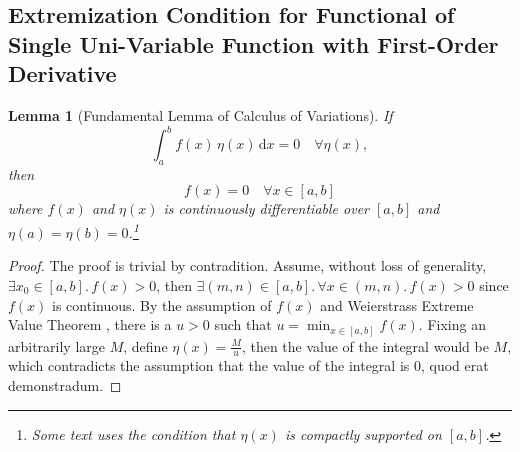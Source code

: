 \documentclass[12pt,a4paper]{article}
\newtheorem{lemma}{Lemma}
\begin{document}
\subsection{Extremization Condition for Functional of Single Uni-Variable Function with First-Order Derivative}
\begin{lemma}[Fundamental Lemma of Calculus of Variations]
\label{lem:fundamental}
If
\[
\int_a^b f(x)\,\eta(x)\,\mathrm{d}x = 0\quad\forall\eta(x),
\]
then
\[
f(x)=0\quad\forall x\in[a,b]
\]
where $f(x)$ and $\eta(x)$ is continuously differentiable over $[a,b]$ and $\eta(a)=\eta(b)=0$.\footnote{Some text uses the condition that $\eta(x)$ is compactly supported on $[a,b]$.}
\end{lemma}
\begin{proof}
The proof is trivial by contradition. Assume, without loss of generality, $\exists x_0\in[a,b].\,f(x)>0$, then $\exists (m,n)\in[a,b].\,\forall x\in(m,n).\,f(x)>0$ since $f(x)$ is continuous. By the assumption of $f(x)$ and Weierstrass Extreme Value Theorem \cite{rudin_principles}, there is a $u>0$ such that $\displaystyle u=\min_{x\in[a,b]}f(x)$. Fixing an arbitrarily large $M$, define $\displaystyle \eta(x)=\frac{M}{u}$, then the value of the integral would be $M$, which contradicts the assumption that the value of the integral is $0$, quod erat demonstradum.
\end{proof}
\end{document}
